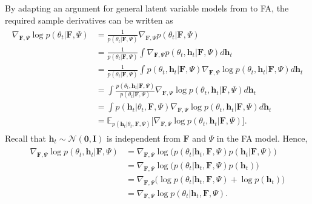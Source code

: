 \documentclass[msc,deptreport.inf]{infthesis} %
\newcommand{\matr}[1]{\mathbf{#1}}
\newcommand{\E}{\mathbb E}
\begin{document}
By adapting an argument for general latent variable models from \cite{barber2007} to FA, the required sample derivatives can be written as
\begin{align}\label{eqn:grad_log_likelihood}
\begin{split}
	\nabla_{\matr{F}, \Psi} \log p(\theta_t | \matr{F}, \Psi) 
	& = \frac{1}{p(\theta_t | \matr{F}, \Psi)} \nabla_{\matr{F}, \Psi} p(\theta_t | \matr{F}, \Psi) \\
	& = \frac{1}{p(\theta_t | \matr{F}, \Psi)} \int \nabla_{\matr{F}, \Psi} p(\theta_t, \matr{h}_t | \matr{F}, \Psi) d\matr{h}_t \\
	& = \frac{1}{p(\theta_t | \matr{F}, \Psi)} \int p(\theta_t, \matr{h}_t | \matr{F}, \Psi) \nabla_{\matr{F}, \Psi} \log p(\theta_t, \matr{h}_t | \matr{F}, \Psi) d\matr{h}_t \\
	& = \int \frac{p(\theta_t, \matr{h}_t | \matr{F}, \Psi)}{p(\theta_t | \matr{F}, \Psi)} \nabla_{\matr{F}, \Psi} \log p(\theta_t, \matr{h}_t | \matr{F}, \Psi)  d\matr{h}_t \\
	& = \int p(\matr{h}_t | \theta_t, \matr{F}, \Psi) \nabla_{\matr{F}, \Psi} \log p(\theta_t, \matr{h}_t | \matr{F}, \Psi)  d\matr{h}_t\\
	& = \E_{p(\matr{h}_t | \theta_t, \matr{F}, \Psi)} \big[ \nabla_{\matr{F}, \Psi} \log p(\theta_t, \matr{h}_t | \matr{F}, \Psi) \big].
\end{split}
\end{align}
Recall that $\matr{h}_t \sim \mathcal{N}(\matr{0}, \matr{I})$ is independent from $\matr{F}$ and $\Psi$ in the FA model. Hence,
\begin{align}\label{eqn:grad_log_complete_likelihood}
\begin{split}
	\nabla_{\matr{F}, \Psi} \log p(\theta_t, \matr{h}_t | \matr{F}, \Psi)
	& = \nabla_{\matr{F}, \Psi} \log \big(p(\theta_t | \matr{h}_t, \matr{F}, \Psi)p(\matr{h}_t | \matr{F}, \Psi)\big) \\
	& = \nabla_{\matr{F}, \Psi} \log \big(p(\theta_t | \matr{h}_t, \matr{F}, \Psi)p(\matr{h}_t)\big) \\
	& = \nabla_{\matr{F}, \Psi} \big( \log p(\theta_t | \matr{h}_t, \matr{F}, \Psi) + \log p(\matr{h}_t)\big) \\
	& = \nabla_{\matr{F}, \Psi} \log p(\theta_t | \matr{h}_t, \matr{F}, \Psi).
\end{split}
\end{align}
\end{document}
